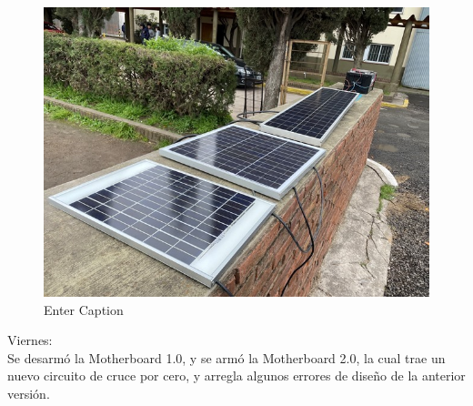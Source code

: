 \begin{figure}[H]
    \centering
    \includegraphics[width=0.75\linewidth]{informes/IMG_8914.jpg}
    \caption{Enter Caption}
\end{figure}

Viernes: \\
Se desarmó la Motherboard 1.0, y se armó la Motherboard 2.0, la cual trae un nuevo circuito de cruce por cero, y arregla algunos errores de diseño de la anterior versión.\\

